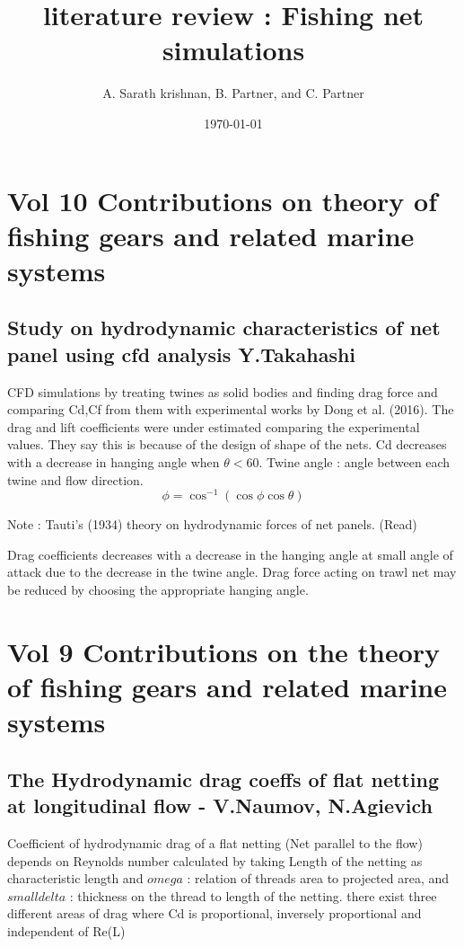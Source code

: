 \documentclass[letterpaper,12pt]{article}
\begin{document}
\title{literature review : Fishing net simulations}
\author{A. Sarath krishnan, B. Partner, and C. Partner}
\date{\today}
\maketitle

\begin{abstract}

\end{abstract}


\section{Vol 10 Contributions on theory of fishing gears and related marine systems}
\subsection{Study on hydrodynamic characteristics of net panel using cfd analysis Y.Takahashi}
CFD simulations by treating twines as solid bodies and finding drag force and comparing Cd,Cf from them with experimental works by Dong et al. (2016). The drag and lift coefficients were under estimated comparing the experimental values. They say this is because of the design of shape of the nets. Cd decreases with a decrease in hanging angle when $\theta < 60$. Twine angle : angle between each twine and flow direction.
$$ \phi = \cos^{-1}{(\cos{\phi}\cos{\theta})}$$

Note : Tauti’s (1934) theory on hydrodynamic forces of net panels. (Read)

Drag coefficients decreases with a decrease in the hanging angle at small angle of attack due to the decrease in the twine angle. Drag force acting on trawl net may be reduced by choosing the appropriate hanging angle.
 


\section{Vol 9 Contributions on the theory of fishing gears and related marine systems}

\subsection{The Hydrodynamic drag coeffs of flat netting at longitudinal flow - V.Naumov, N.Agievich}
Coefficient of hydrodynamic drag of a flat netting (Net parallel to the flow) depends on Reynolds number calculated by taking Length of the netting as characteristic length and \(omega\) : relation of threads area to projected area, and \(small delta\) : thickness on the thread to length of the netting. there exist three different areas of drag where Cd is proportional, inversely proportional and independent of Re(L)
\end{document}

